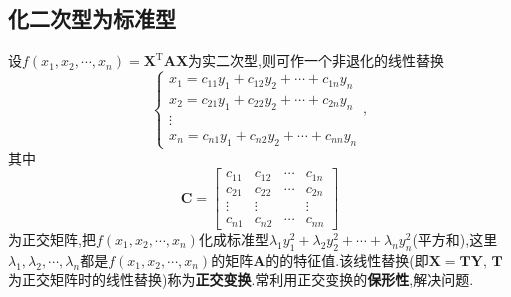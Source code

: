 \documentclass[9pt,a4paper]{book}
\begin{document}
\subsection{化二次型为标准型}
\begin{theorem}
	设$ f( x_1,x_2,\cdots,x_n )=\bm{X}^{\mathrm{T}}\bm{AX} $为实二次型,则可作一个非退化的线性替换\[ 
	\left\{
	\begin{array}{c}
	x_1=c_{11}y_1+c_{12}y_2+\cdots+c_{1n}y_n\\
	x_2=c_{21}y_1+c_{22}y_2+\cdots+c_{2n}y_n\\
	\vdots \\
	x_n=c_{n1}y_1+c_{n2}y_2+\cdots+c_{nn}y_n
	\end{array}
	\right.,
 \]其中\[ \bm{C}=\begin{bmatrix}
 c_{11}&c_{12}&\cdots&c_{1n}\\
 c_{21}&c_{22}&\cdots&c_{2n}\\
 \vdots&\vdots& &\vdots\\
 c_{n1}&c_{n2}&\cdots&c_{nn}
 \end{bmatrix} \]为正交矩阵,把$ f( x_1,x_2,\cdots,x_n ) $化成标准型$ \lambda_1 y_1^2+\lambda_2 y_2^2+\cdots+\lambda_n y_n^2 $(平方和),这里$ \lambda_1,\lambda_2,\cdots,\lambda_n $都是$ f( x_1,x_2,\cdots,x_n ) $的矩阵$ \bm{A} $的的特征值.该线性替换(即$ \bm{X}=\bm{TY},\,\bm{T} $为正交矩阵时的线性替换)称为\textbf{正交变换}.常利用正交变换的\textbf{保形性},解决问题.
\end{theorem}
\end{document}
